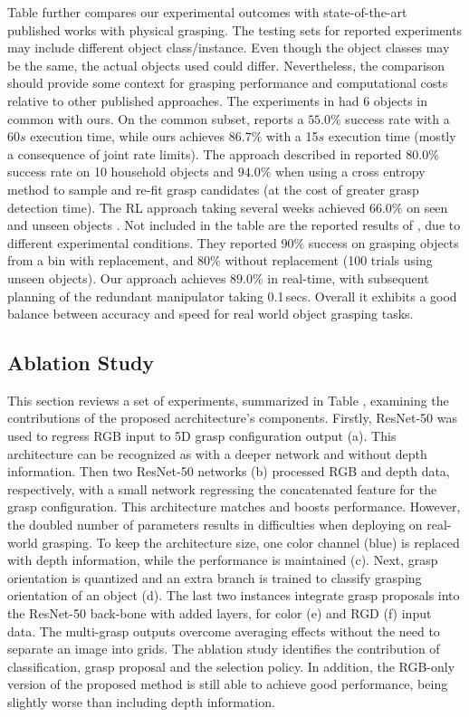 \documentclass[letterpaper, 10 pt, journal, twoside]{IEEEtran}
\begin{document}
Table  further compares our experimental outcomes 
with state-of-the-art published works with physical grasping.  The testing sets for reported
experiments may include different object class/instance.  Even though
the object classes may be the same, the actual objects used could
differ.  Nevertheless, the comparison should provide some context for
grasping performance and computational costs relative to other published
approaches.
The experiments in \cite{watson2017real} had 6 objects in common with
ours.  On the common subset, \cite{watson2017real} reports a $55.0 \%$ 
success rate with a 60$s$ execution time, while ours achieves $86.7\%$
with a 15$s$ execution time (mostly a consequence of joint rate limits). 
The approach described in \cite{MaEtAl_RSS[2017]} reported $80.0 \%$
success rate on 10 household objects and $94.0 \%$ when using a cross
entropy method \cite{levine2016learning} to sample and re-fit grasp
candidates (at the cost of greater grasp detection time).   
The RL approach taking several weeks achieved $66.0 \%$ on seen and
unseen objects \cite{pinto2016supersizing}.  
Not included in the table are the reported results of
\cite{levine2016learning}, due to different experimental conditions.
They reported 90\% success on grasping objects from a bin with
replacement, and 80\% without replacement (100 trials using unseen objects).
Our approach achieves $89.0 \%$ in real-time, with subsequent planning
of the redundant manipulator taking 0.1\,secs.  Overall it exhibits
a good balance between accuracy and speed for real world object grasping
tasks.  

\subsection{Ablation Study}
This section reviews a set of experiments, summarized in Table
, examining the contributions of the proposed
acrchitecture's components. Firstly, ResNet-50 was used to regress RGB 
input to 5D grasp configuration output (a).  This architecture can be
recognized as \cite{redmon2015real} with a deeper network and without depth
information. Then two ResNet-50 networks (b) processed RGB and depth data, 
respectively, with a small network regressing the concatenated feature for
the grasp configuration. 
This architecture matches \cite{kumra2016robotic} and boosts performance. 
However, the doubled number of parameters results in difficulties when
deploying on real-world grasping.  To keep the architecture size, one
color channel (blue) is replaced with depth information, while the performance 
is maintained (c). Next, grasp orientation is quantized and an extra branch is 
trained to classify grasping orientation of an object (d). 
The last two instances integrate grasp proposals into the ResNet-50 back-bone 
with added layers, for color (e) and RGD (f) input data. 
The multi-grasp outputs overcome averaging effects \cite{redmon2015real}
without the need to separate an image into grids. The ablation study identifies the contribution of classification, grasp proposal and the selection policy. In addition, the RGB-only version of
the proposed method is still able to achieve good performance, being
slightly worse than including depth information.
\end{document}

